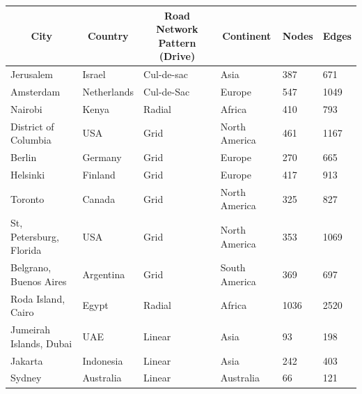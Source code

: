 \begin{landscape}
\begin{table}[]
\begin{tabular}{|l|l|l|l|l|l|}
\hline
\multicolumn{1}{|c|}{\textbf{City}} &
  \multicolumn{1}{c|}{\textbf{Country}} &
  \multicolumn{1}{c|}{\textbf{Road Network Pattern (Drive)}} &
  \multicolumn{1}{c|}{\textbf{Continent}} &
  \multicolumn{1}{c|}{\textbf{Nodes}} &
  \multicolumn{1}{c|}{\textbf{Edges}} \\ \hline
Jerusalem                       & Israel      & Cul-de-sac                & Asia          & 387  & 671  \\ \hline
Amsterdam                       & Netherlands & Cul-de-Sac                & Europe        & 547  & 1049 \\ \hline
Nairobi                         & Kenya       & Radial                    & Africa        & 410  & 793  \\ \hline
District of Columbia            & USA         & Grid                      & North America & 461  & 1167 \\ \hline
Berlin                          & Germany     & Grid                      & Europe        & 270  & 665  \\ \hline
Helsinki                        & Finland     & Grid                      & Europe        & 417  & 913  \\ \hline
Toronto                         & Canada      & Grid                      & North America & 325  & 827  \\ \hline
St, Petersburg, Florida         & USA         & Grid                      & North America & 353  & 1069 \\ \hline
Belgrano, Buenos Aires          & Argentina   & Grid                      & South America & 369  & 697  \\ \hline
Roda Island, Cairo              & Egypt       & Radial                    & Africa        & 1036 & 2520 \\ \hline
Jumeirah Islands, Dubai         & UAE         & Linear                    & Asia          & 93   & 198  \\ \hline
Jakarta                         & Indonesia   & Linear                    & Asia          & 242  & 403  \\ \hline
Sydney                          & Australia   & Linear                    & Australia     & 66   & 121  \\ \hline

\end{tabular}
\end{table}
\end{landscape}
